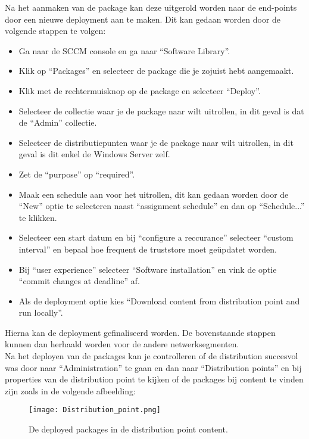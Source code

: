 Na het aanmaken van de package kan deze uitgerold worden naar de end-points door een nieuwe deployment aan te maken. Dit kan gedaan worden door de volgende stappen te volgen:
\begin{itemize}
    \item Ga naar de SCCM console en ga naar ``Software Library''.
    \item Klik op ``Packages'' en selecteer de package die je zojuist hebt aangemaakt.
    \item Klik met de rechtermuisknop op de package en selecteer ``Deploy''.
    \item Selecteer de collectie waar je de package naar wilt uitrollen, in dit geval is dat de ``Admin'' collectie.
    \item Selecteer de distributiepunten waar je de package naar wilt uitrollen, in dit geval is dit enkel de Windows Server zelf.
    \item Zet de ``purpose'' op ``required''.
    \item Maak een schedule aan voor het uitrollen, dit kan gedaan worden door de ``New'' optie te selecteren naast ``assignment schedule'' en dan op ``Schedule...'' te klikken.
    \item Selecteer een start datum en bij ``configure a reccurance'' selecteer ``custom interval'' en bepaal hoe frequent de truststore moet geüpdatet worden.
    \item Bij ``user experience'' selecteer ``Software installation'' en vink de optie ``commit changes at deadline'' af.
    \item Als de deployment optie kies ``Download content from distribution point and run locally''.
\end{itemize}
Hierna kan de deployment gefinaliseerd worden. 
De bovenstaande stappen kunnen dan herhaald worden voor de andere netwerksegmenten. \\

Na het deployen van de packages kan je controlleren of de distribution succesvol was door naar ``Administration'' te gaan en dan naar ``Distribution points'' en bij properties van de distribution point te kijken of de packages bij content te vinden zijn zoals in de volgende afbeelding:

\begin{figure}[H]
  \centering
  \texttt{[image: Distribution\_point.png]}
  \caption[Distribution point content met packages]{\label{fig:DP} De deployed packages in de distribution point content.}
\end{figure}

